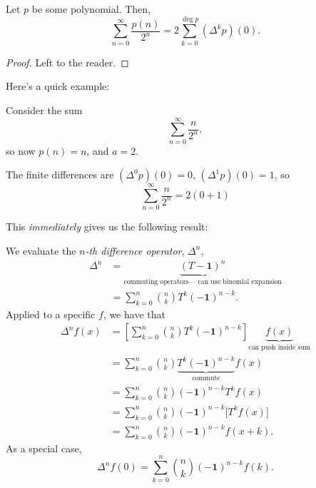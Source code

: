 \documentclass{article}
\DeclareMathOperator{\degree}{deg}
\begin{document}
\begin{corollary}
    Let $p$ be some polynomial.
    Then,
    \[
        \sum_{n=0}^\infty \frac{p(n)}{2^n} = 2\sum_{k=0}^{\degree p} (\Delta^k p)(0).
    \]
\end{corollary}

\begin{proof}
    Left to the reader.
\end{proof}

Here's a quick example:

\begin{example}
    Consider the sum
    \[
        \sum_{n=0}^\infty \frac{n}{2^n},
    \]
    so now $p(n) = n$, and $a = 2$.

    The finite differences are $(\Delta^0 p)(0) = 0$, $(\Delta^1 p)(0) = 1$, so
    \[
        \sum_{n=0}^\infty \frac{n}{2^n} = 2(0 + 1)
    \]
\end{example}


\iffalse
This \textit{immediately} gives us the following result:

\begin{computation}
    We evaluate the \textit{$n$-th difference operator}, $\Delta^n$,
    \begin{align*}
        \Delta^n &= \underbrace{(T-\mathbf{1})^n}_{\text{commuting operators--- can use binomial expansion}} \\
                 &= \sum_{k=0}^n \binom{n}{k} T^k(-\mathbf{1})^{n-k}.
    \end{align*}
    Applied to a specific $f$, we have that
    \begin{align*}
        \Delta^n f(x) &= \left[\sum_{k=0}^n \binom{n}{k} T^k(-\mathbf{1})^{n-k}\right] \underbrace{f(x)}_\text{can push inside sum} \\
                      &= \sum_{k=0}^n \binom{n}{k} \underbrace{T^k(-\mathbf{1})^{n-k}}_{\text{commute}}f(x) \\
                      &= \sum_{k=0}^n \binom{n}{k}(-\mathbf{1})^{n-k}T^kf(x) \\
                      &= \sum_{k=0}^n \binom{n}{k}(-\mathbf{1})^{n-k}\Big[T^kf(x)\Big] \\
                      &= \sum_{k=0}^n \binom{n}{k}(-\mathbf{1})^{n-k}f(x+k).
    \end{align*}
    As a special case,
    \[
        \Delta^n f(0) = \sum_{k=0}^n \binom{n}{k}(-\mathbf{1})^{n-k}f(k).
    \]
\end{computation}
\end{document}
